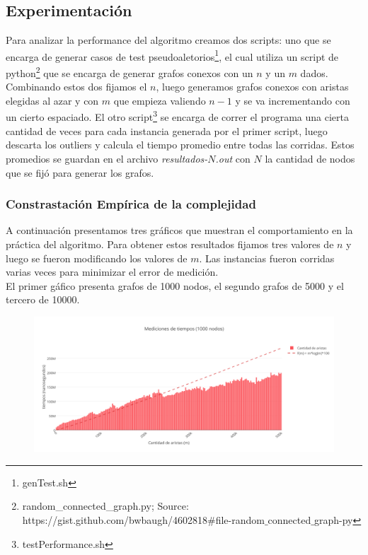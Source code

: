 \subsection{Experimentación}

Para analizar la performance del algoritmo creamos dos scripts: uno que se encarga de generar casos de test pseudoaletorios\footnote{genTest.sh}, el cual utiliza un script de python\footnote{random_connected_graph.py; Source: https://gist.github.com/bwbaugh/4602818$\#$file-random$\_$connected$\_$graph-py} que se encarga de generar grafos conexos con un $n$ y un $m$ dados. Combinando estos dos fijamos el $n$, luego generamos grafos conexos con aristas elegidas al azar y con $m$ que empieza valiendo $n-1$ y se va incrementando con un cierto espaciado. El otro script\footnote{testPerformance.sh} se encarga de correr el programa una cierta cantidad de veces para cada instancia generada por el primer script, luego descarta los outliers y calcula el tiempo promedio entre todas las corridas. Estos promedios se guardan en el archivo \emph{resultados-$N$.out} con $N$ la cantidad de nodos que se fijó para generar los grafos.

\newpage

\subsubsection{Constrastación Empírica de la complejidad}

A continuación presentamos tres gráficos que muestran el comportamiento en la práctica del algoritmo. Para obtener estos resultados fijamos tres valores de $n$ y luego se fueron modificando los valores de $m$. Las instancias fueron corridas varias veces para minimizar el error de medición.\\

El primer gáfico presenta grafos de 1000 nodos, el segundo grafos de 5000 y el tercero de 10000.

\begin{figure}[h!]
	\centering
 	\includegraphics[scale=0.6]{imagenes/ej3/tiempos1000B.png}
 \end{figure}

